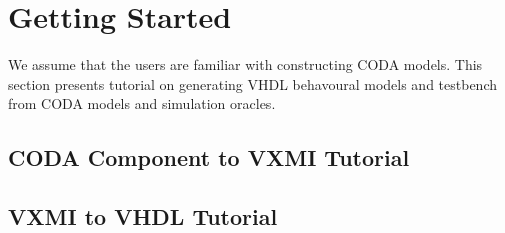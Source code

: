 \section{Getting Started}
\label{sec:vhdl-getting-started}

We assume that the users are familiar with constructing CODA models.  This section presents tutorial on generating VHDL behavoural models and testbench from CODA models and simulation oracles.

\subsection{CODA Component to VXMI Tutorial}
\label{sec:coda-vxmi-tutorial}


\subsection{VXMI to VHDL Tutorial}
\label{sec:vxmi-vhdl-tutorial}






